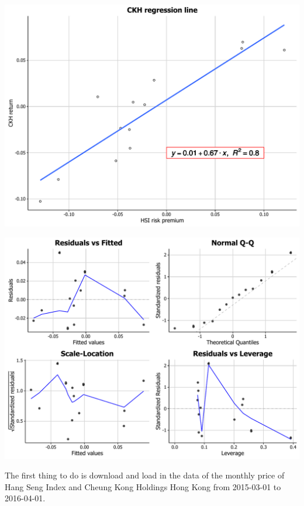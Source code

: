 \documentclass[]{article}
\begin{document}
\begin{center}\includegraphics{0_all_posts_pdf/lr_final-1} \end{center}

\begin{center}\includegraphics{0_all_posts_pdf/lr_final-2} \end{center}

The first thing to do is download and load in the data of the monthly
price of Hang Seng Index and Cheung Kong Holdings Hong Kong from
2015-03-01 to 2016-04-01.
\end{document}
